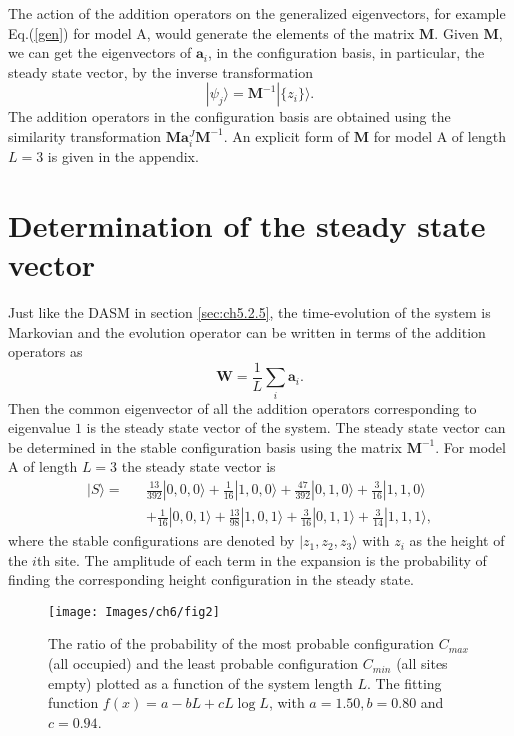 \documentclass[11pt,a4paper]{book}
\begin{document}
The action of the addition operators on the generalized eigenvectors, 
for example Eq.(\ref{gen}) for model A, would generate the elements of 
the matrix $\mathbf{M}$. 
Given $\mathbf{M}$, we can get the eigenvectors of $\mathbf{a}_i$, in
the configuration basis, in 
particular, the steady state vector, by the inverse transformation 
\begin{equation}
|\psi_j\rangle = \mathbf{M}^{-1} |\{z_i\}\rangle.
\end{equation}
The  addition operators in the  
configuration basis  are obtained using the similarity transformation 
$\mathbf{M}\mathbf{a}^J_i\mathbf{M}^{-1}$. An explicit form of 
$\mathbf{M}$ for model A of length $L=3$ is given in the appendix.

\section{Determination of the steady state vector}\label{sec:ch5.6}
Just like the DASM in section \ref{sec:ch5.2.5},
the time-evolution of the system is Markovian and the
evolution operator can be written in terms of the addition operators as
\begin{equation}
  \mathbf{W}=\frac{1}{L}\sum_i\mathbf{a}_i.
\end{equation}
Then the common eigenvector of all the addition operators
corresponding to eigenvalue $1$ is the steady
state vector of the system. The steady state vector can be determined
in the stable configuration basis using the matrix $\mathbf{M}^{-1}$.
For model A of length $L=3$ the steady state vector is 
\begin{eqnarray}
  |S\rangle = &&\frac{13}{392}|0, 0, 0\rangle + \frac{1}{16} |1, 0, 0\rangle 
+ \frac{47}{392} |0, 1, 0\rangle + \frac{3}{16} |1, 1, 0\rangle \nonumber \\
   &&+  \frac{1}{16} |0, 0, 1\rangle + \frac{13}{98} |1, 0, 1\rangle 
+ \frac{3}{16} |0, 1, 1\rangle + \frac{3}{14} |1, 1, 1\rangle,
\end{eqnarray}
where the stable configurations are denoted by $|z_1,z_2,z_3\rangle$ with
$z_i$ as the height of the $i$th site.
The amplitude of each term in the expansion is the probability
of finding the corresponding height configuration in the steady state.

\begin{SCfigure}
    \texttt{[image: Images/ch6/fig2]}
    \caption{The ratio of the probability of the most probable
configuration $C_{max}$ (all occupied) and the least probable
configuration $C_{min}$ (all sites empty) plotted as a function of 
the system
length $L$. The fitting function $f(x)=a-bL+cL\log L$, with $a=1.50,
b=0.80$ and $c=0.94$.}
    \label{fig2}
\end{SCfigure}
\end{document}
